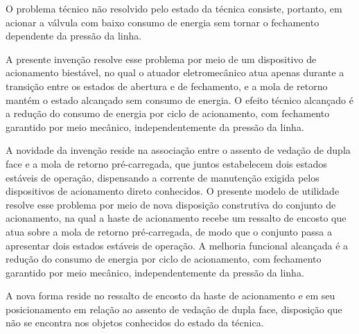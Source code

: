 \pnum O problema técnico não resolvido pelo estado da técnica consiste,
portanto, em acionar a válvula com baixo consumo de energia sem tornar o
fechamento dependente da pressão da linha.

\ifinvencao
\pnum A presente invenção resolve esse problema por meio de um dispositivo de
acionamento biestável, no qual o atuador eletromecânico atua apenas durante a
transição entre os estados de abertura e de fechamento, e a mola de retorno
mantém o estado alcançado sem consumo de energia. O efeito técnico alcançado é
a redução do consumo de energia por ciclo de acionamento, com fechamento
garantido por meio mecânico, independentemente da pressão da linha.

\pnum A novidade da invenção reside na associação entre o assento de vedação de
dupla face e a mola de retorno pré-carregada, que juntos estabelecem dois
estados estáveis de operação, dispensando a corrente de manutenção exigida
pelos dispositivos de acionamento direto conhecidos.
\else
\pnum O presente modelo de utilidade resolve esse problema por meio de nova
disposição construtiva do conjunto de acionamento, na qual a haste de
acionamento recebe um ressalto de encosto que atua sobre a mola de retorno
pré-carregada, de modo que o conjunto passa a apresentar dois estados estáveis
de operação. A melhoria funcional alcançada é a redução do consumo de energia
por ciclo de acionamento, com fechamento garantido por meio mecânico,
independentemente da pressão da linha.

\pnum A nova forma reside no ressalto de encosto da haste de acionamento e em
seu posicionamento em relação ao assento de vedação de dupla face, disposição
que não se encontra nos objetos conhecidos do estado da técnica.
\fi
